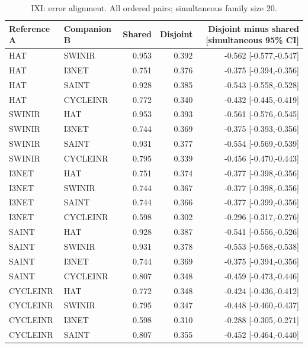 \begin{table}[t]\centering\small
\caption{IXI: error alignment. All ordered pairs; simultaneous family size 20.}
\begin{tabular}{llrrr}\toprule Reference A & Companion B & Shared & Disjoint & Disjoint minus shared [simultaneous 95\% CI]\\\midrule
HAT & SWINIR & 0.953 & 0.392 & -0.562 [-0.577,-0.547] \\
HAT & I3NET & 0.751 & 0.376 & -0.375 [-0.394,-0.356] \\
HAT & SAINT & 0.928 & 0.385 & -0.543 [-0.558,-0.528] \\
HAT & CYCLEINR & 0.772 & 0.340 & -0.432 [-0.445,-0.419] \\
SWINIR & HAT & 0.953 & 0.393 & -0.561 [-0.576,-0.545] \\
SWINIR & I3NET & 0.744 & 0.369 & -0.375 [-0.393,-0.356] \\
SWINIR & SAINT & 0.931 & 0.377 & -0.554 [-0.569,-0.539] \\
SWINIR & CYCLEINR & 0.795 & 0.339 & -0.456 [-0.470,-0.443] \\
I3NET & HAT & 0.751 & 0.374 & -0.377 [-0.398,-0.356] \\
I3NET & SWINIR & 0.744 & 0.367 & -0.377 [-0.398,-0.356] \\
I3NET & SAINT & 0.744 & 0.366 & -0.377 [-0.399,-0.356] \\
I3NET & CYCLEINR & 0.598 & 0.302 & -0.296 [-0.317,-0.276] \\
SAINT & HAT & 0.928 & 0.387 & -0.541 [-0.556,-0.526] \\
SAINT & SWINIR & 0.931 & 0.378 & -0.553 [-0.568,-0.538] \\
SAINT & I3NET & 0.744 & 0.369 & -0.375 [-0.394,-0.356] \\
SAINT & CYCLEINR & 0.807 & 0.348 & -0.459 [-0.473,-0.446] \\
CYCLEINR & HAT & 0.772 & 0.348 & -0.424 [-0.436,-0.412] \\
CYCLEINR & SWINIR & 0.795 & 0.347 & -0.448 [-0.460,-0.437] \\
CYCLEINR & I3NET & 0.598 & 0.310 & -0.288 [-0.305,-0.271] \\
CYCLEINR & SAINT & 0.807 & 0.355 & -0.452 [-0.464,-0.440] \\
\bottomrule\end{tabular}\end{table}
